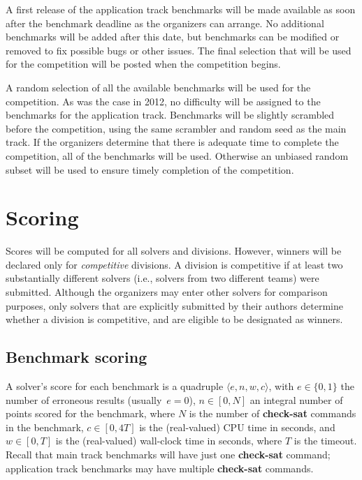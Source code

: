 \documentclass[12pt]{article}
\newcommand{\akey}[1]{\textbf{#1}}
\begin{document}
A first release of the application track
benchmarks will be made available as soon after the benchmark deadline as the organizers can arrange.
No additional
benchmarks will be added after this date, but benchmarks can be
modified or removed to fix possible bugs or other issues.
The final selection that will be used for the competition will be posted when the competition begins.

A random selection of all the available benchmarks will be used for the competition.
As was the case in 2012, no difficulty will be assigned to the benchmarks for the application track.
Benchmarks will be slightly scrambled before the competition, using the same scrambler and
random seed as the main track.
If the organizers determine that there is adequate time to complete the competition, all of the benchmarks will be used. Otherwise an unbiased random subset will be used to ensure timely completion of the competition.


\section{Scoring}
\label{sec:scoring}

Scores will be computed for all solvers and divisions.  However,
winners will be declared only for \emph{competitive} divisions.  A
division is competitive if at least two substantially different
solvers (i.e., solvers from two different teams) were submitted.
Although the organizers may enter other solvers for comparison
purposes, only solvers that are explicitly submitted by their authors
determine whether a division is competitive, and are eligible to be
designated as winners.

\subsection{Benchmark scoring}

A solver's score for each benchmark is a quadruple $\langle e, n, w,
c\rangle$, with $e \in \{0, 1\}$ the number of erroneous results
(usually~$e = 0$), $n \in [0,N]$ an integral number of points scored
for the benchmark, where $N$ is the number of \akey{check-sat}
commands in the benchmark, $c \in [0,4T]$ is the (real-valued) CPU
time in seconds, and $w \in [0,T]$ is the (real-valued) wall-clock
time in seconds, where $T$ is the timeout.  Recall that main track
benchmarks will have just one \akey{check-sat} command; application
track benchmarks may have multiple \akey{check-sat} commands.
\end{document}
